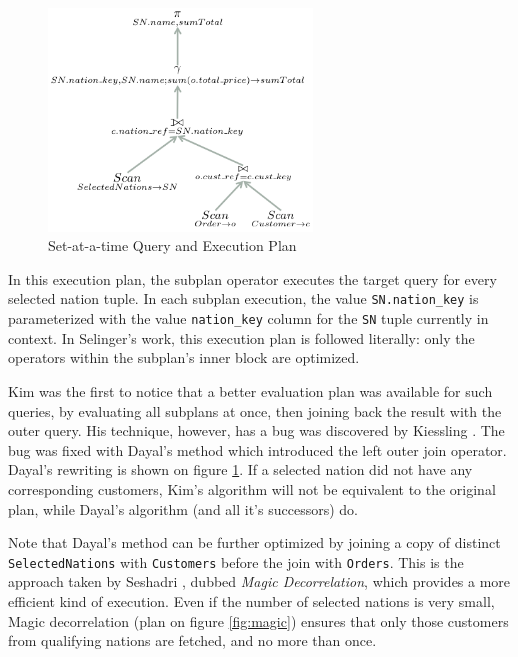 \begin{figure}[h]
\begin{minipage}{0.45\textwidth}
\includegraphics[width=7cm]{images/SAATExecution}
\caption{Set-at-a-time Query and Execution Plan}
\label{fig:saat}
\end{minipage}
\end{figure}

In this execution plan, the subplan operator executes the target query for every selected nation tuple. In each subplan execution, the value \texttt{SN.nation\_key} is parameterized with the value \texttt{nation\_key} column for the \texttt{SN} tuple currently in context. In Selinger's work, this execution plan is followed literally: only the operators within the subplan's inner block are optimized.

Kim \cite{kim:1982aa} was the first to notice that a better evaluation plan was available for such queries, by evaluating all subplans at once, then joining back the result with the outer query. His technique, however, has a bug was discovered by Kiessling \cite{kiessling:1984aa}. The bug was fixed with Dayal's method which introduced the left outer join operator. Dayal's rewriting is shown on figure \ref{fig:saat}. If a selected nation did not have any corresponding customers, Kim's algorithm will not be equivalent to the original plan, while Dayal's algorithm (and all it's successors) do.

Note that Dayal's method can be further optimized by joining a copy of distinct \texttt{SelectedNations} with \texttt{Customers} before the join with \texttt{Orders}. This is the approach taken by Seshadri \cite{seshadri:1996aa}, dubbed \emph{Magic Decorrelation}, which provides a more efficient kind of execution. Even if the number of selected nations is very small, Magic decorrelation (plan on figure \ref{fig:magic}) ensures that only those customers from qualifying nations are fetched, and no more than once.

